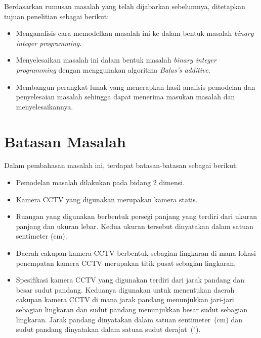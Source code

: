 Berdasarkan rumusan masalah yang telah dijabarkan sebelumnya, ditetapkan tujuan penelitian sebagai berikut:

\begin{itemize}
	\item Menganalisis cara memodelkan masalah ini ke dalam bentuk masalah \textit{binary integer programming}.
	\item Menyelesaikan masalah ini dalam bentuk masalah \textit{binary integer programming} dengan menggunakan algoritma \textit{Balas's additive}.
	\item Membangun perangkat lunak yang menerapkan hasil analisis pemodelan dan penyelesaian masalah sehingga dapat menerima masukan masalah dan menyelesaikannya.
\end{itemize}

\section{Batasan Masalah}
\label{sec:batasan}

Dalam pembahasan masalah ini, terdapat batasan-batasan sebagai berikut:

\begin{itemize}
	\item Pemodelan masalah dilakukan pada bidang 2 dimensi.
	\item Kamera CCTV yang digunakan merupakan kamera statis.
	\item Ruangan yang digunakan berbentuk persegi panjang yang terdiri dari ukuran panjang dan ukuran lebar. Kedua ukuran tersebut dinyatakan dalam satuan sentimeter (cm).
	\item Daerah cakupan kamera CCTV berbentuk sebagian lingkaran di mana lokasi penempatan kamera CCTV merupakan titik pusat sebagian lingkaran.
	\item Spesifikasi kamera CCTV yang digunakan terdiri dari jarak pandang dan besar sudut pandang. Keduanya digunakan untuk menentukan daerah cakupan kamera CCTV di mana jarak pandang menunjukkan jari-jari sebagian lingkaran dan sudut pandang menunjukkan besar sudut sebagian lingkaran. Jarak pandang dinyatakan dalam satuan sentimeter~(cm) dan sudut pandang dinyatakan dalam satuan sudut derajat~(\(^\circ\)).
\end{itemize}

